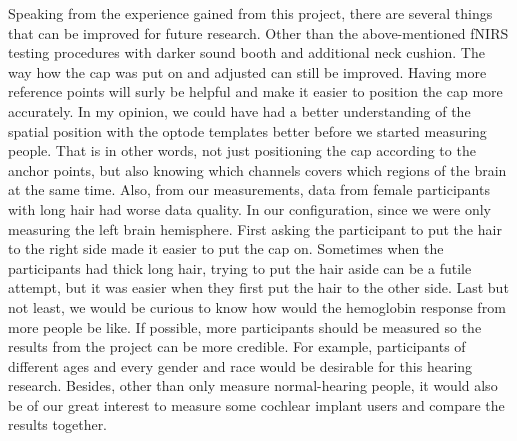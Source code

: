 Speaking from the experience gained from this project, there are several things that can be improved for future research. Other than the above-mentioned fNIRS testing procedures with darker sound booth and additional neck cushion. The way how the cap was put on and adjusted can still be improved. Having more reference points will surly be helpful and make it easier to position the cap more accurately. In my opinion, we could have had a better understanding of the spatial position with the optode templates better before we started measuring people. That is in other words, not just positioning the cap according to the anchor points, but also knowing which channels covers which regions of the brain at the same time. Also, from our measurements, data from female participants with long hair had worse data quality. In our configuration, since we were only measuring the left brain hemisphere. First asking the participant to put the hair to the right side made it easier to put the cap on. Sometimes when the participants had thick long hair, trying to put the hair aside can be a futile attempt, but it was easier when they first put the hair to the other side. Last but not least, we would be curious to know how would the hemoglobin response from more people be like. If possible, more participants should be measured so the results from the project can be more credible. For example, participants of different ages and every gender and race would be desirable for this hearing research. Besides, other than only measure normal-hearing people, it would also be of our great interest to measure some cochlear implant users and compare the results together.